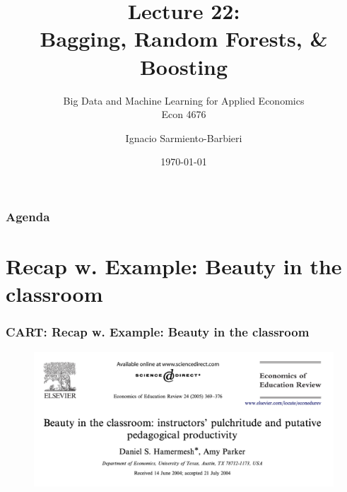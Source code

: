 \documentclass[
  shownotes,
  xcolor={svgnames},
  hyperref={colorlinks,citecolor=DarkBlue,linkcolor=DarkRed,urlcolor=DarkBlue}
  , aspectratio=169]{beamer}
\begin{document}
 
\title[Lecture 22]{Lecture 22: \\ Bagging, Random Forests, \& Boosting}
\subtitle{Big Data and Machine Learning for Applied Economics \\ Econ 4676}
\date{\today}

\author[Sarmiento-Barbieri]{Ignacio Sarmiento-Barbieri}


\begin{frame}[noframenumbering]
\maketitle
\end{frame}






\begin{frame}
\frametitle{Agenda}

\tableofcontents

\end{frame}
\section{Recap w. Example: Beauty in the classroom }
\begin{frame}[fragile]
\frametitle{CART: Recap w. Example: Beauty in the classroom}




  \begin{figure}[H] \centering
            \captionsetup{justification=centering}
              \includegraphics[scale=0.4]{figures/beauty_hamermesh}
              
 \end{figure}

\end{frame}
\end{document}
